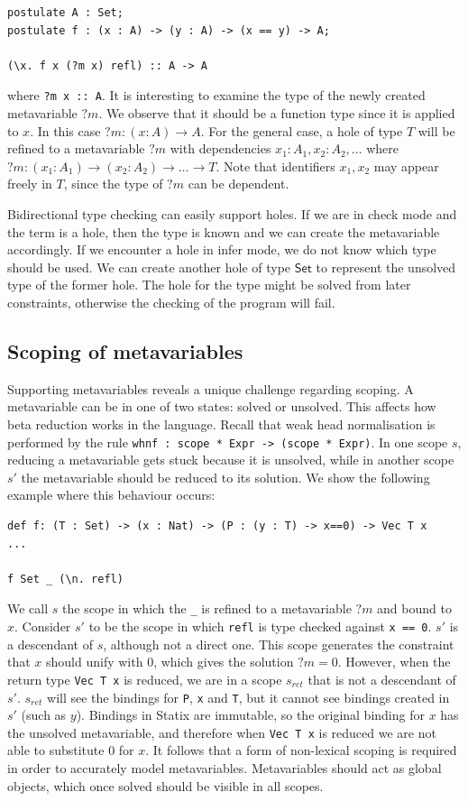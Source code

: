 \begin{lstlisting}
postulate A : Set;
postulate f : (x : A) -> (y : A) -> (x == y) -> A;

(\x. f x (?m x) refl) :: A -> A
\end{lstlisting}
where \texttt{?m x :: A}. It is interesting to examine the type of the newly created metavariable $?m$. We observe that it should be a function type since it is applied to $x$. In this case $?m : (x : A) \rightarrow A $. For the general case, a hole of type $T$ will be refined to a metavariable $?m$ with dependencies $x_1:A_1, x_2:A_2, \dots$ where $?m : (x_1 : A_1) \rightarrow (x_2 : A_2) \rightarrow \dots \rightarrow T$. Note that identifiers $x_1, x_2$ may appear freely in $T$, since the type of $?m$ can be dependent. \par

Bidirectional type checking can easily support holes. If we are in check mode and the term is a hole, then the type is known and we can create the metavariable accordingly. If we encounter a hole in infer mode, we do not know which type should be used. We can create another hole of type $\mathsf{Set}$ to represent the unsolved type of the former hole. The hole for the type might be solved from later constraints, otherwise the checking of the program will fail.

\subsection{Scoping of metavariables}
\label{sec:scopingmetas}
Supporting metavariables reveals a unique challenge regarding scoping. A metavariable can be in one of two states: solved or unsolved. This affects how beta reduction works in the language. Recall that weak head normalisation is performed by the rule \texttt{whnf : scope * Expr -> (scope * Expr)}. In one scope $s$, reducing a metavariable gets stuck because it is unsolved, while in another scope $s'$ the metavariable should be reduced to its solution. We show the following example where this behaviour occurs:
\begin{lstlisting}
def f: (T : Set) -> (x : Nat) -> (P : (y : T) -> x==0) -> Vec T x
...

f Set _ (\n. refl)
\end{lstlisting}
We call $s$ the scope in which the \texttt{\_} is refined to a metavariable $?m$ and bound to $x$. Consider $s'$ to be the scope in which \texttt{refl} is type checked against \texttt{x == 0}. $s'$ is a descendant of $s$, although not a direct one. This scope generates the constraint that $x$ should unify with 0, which gives the solution $?m = 0$. However, when the return type \texttt{Vec T x} is reduced, we are in a scope $s_{ret}$ that is not a descendant of $s'$. $s_{ret}$ will see the bindings for \texttt{P}, \texttt{x} and \texttt{T}, but it cannot see bindings created in $s'$ (such as $y$). Bindings in Statix are immutable, so the original binding for $x$ has the unsolved metavariable, and therefore when \texttt{Vec T x} is reduced we are not able to substitute 0 for $x$. It follows that a form of non-lexical scoping is required in order to accurately model metavariables. Metavariables should act as global objects, which once solved should be visible in all scopes.



